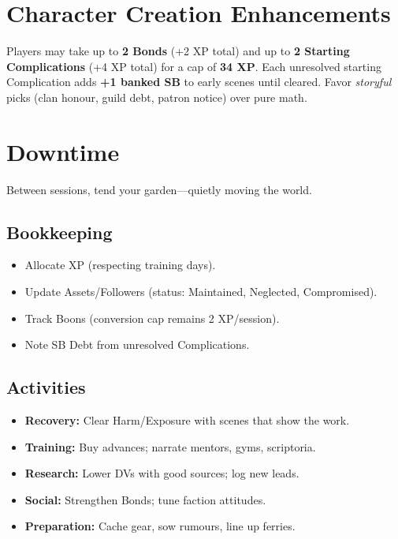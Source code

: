 \section{Character Creation Enhancements}
Players may take up to \textbf{2 Bonds} (+2 XP total) and up to \textbf{2 Starting Complications} (+4 XP total) for a cap of \textbf{34 XP}. Each unresolved starting Complication adds \textbf{+1 banked SB} to early scenes until cleared. Favor \emph{storyful} picks (clan honour, guild debt, patron notice) over pure math.

\section{Downtime}

Between sessions, tend your garden—quietly moving the world.

\subsection{Bookkeeping}
\begin{itemize}
  \item Allocate XP (respecting training days).
  \item Update Assets/Followers (status: Maintained, Neglected, Compromised).
  \item Track Boons (conversion cap remains 2 XP/session).
  \item Note SB Debt from unresolved Complications.
\end{itemize}

\subsection{Activities}
\begin{itemize}
  \item \textbf{Recovery:} Clear Harm/Exposure with scenes that show the work.
  \item \textbf{Training:} Buy advances; narrate mentors, gyms, scriptoria.
  \item \textbf{Research:} Lower DVs with good sources; log new leads.
  \item \textbf{Social:} Strengthen Bonds; tune faction attitudes.
  \item \textbf{Preparation:} Cache gear, sow rumours, line up ferries.
\end{itemize}

